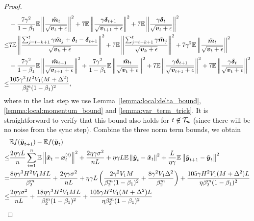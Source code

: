 \begin{proof}
\begin{align*}
    & + 
    \frac{7\gamma^2}{1-\beta_1}\mathbb{E}\left\| \frac{\tilde{\boldsymbol{m}}_{t}}{\sqrt{\boldsymbol{v}_{t}+\epsilon}} \right\|^2 + 
    7\mathbb{E}\left\| \frac{\gamma\boldsymbol{\delta}_{t+1}}{\sqrt{\boldsymbol{v}_{t+1}+\epsilon}} \right\|^2 + 
    7\mathbb{E}\left\| \frac{\gamma\boldsymbol{\delta}_{t}}{\sqrt{\boldsymbol{v}_{t}+\epsilon}} \right\|^2 \\
\leq & 7\mathbb{E}\left\| \frac{\sum_{j=t-k+1}^{t}\gamma\tilde{\boldsymbol{m}}_j + \boldsymbol{\delta}_t - \boldsymbol{\delta}_{t+1}}{\sqrt{\boldsymbol{v}_k+\epsilon}} \right\|^2 + 7\mathbb{E}\left\| \frac{\sum_{j=t-k+1}^{t}\gamma\tilde{\boldsymbol{m}}_j}{\sqrt{\boldsymbol{v}_k+\epsilon}} \right\|^2 + 
    7\gamma^2\mathbb{E}\left\| \frac{\tilde{\boldsymbol{m}}_t}{\sqrt{\boldsymbol{v}_t+\epsilon}} \right\|^2 \\
    & + 
    \frac{7\gamma^2}{1-\beta_1}\mathbb{E}\left\| \frac{\tilde{\boldsymbol{m}}_{t+1}}{\sqrt{\boldsymbol{v}_{t+1}+\epsilon}} \right\|^2 + 
    \frac{7\gamma^2}{1-\beta_1}\mathbb{E}\left\| \frac{\tilde{\boldsymbol{m}}_{t}}{\sqrt{\boldsymbol{v}_{t}+\epsilon}} \right\|^2 + 
    7\mathbb{E}\left\| \frac{\gamma\boldsymbol{\delta}_{t+1}}{\sqrt{\boldsymbol{v}_{t+1}+\epsilon}} \right\|^2 + 
    7\mathbb{E}\left\| \frac{\gamma\boldsymbol{\delta}_{t}}{\sqrt{\boldsymbol{v}_{t}+\epsilon}} \right\|^2 \\
\leq & \frac{105\gamma^2H^2V_1(M+\Delta^2)}{\beta_2^m(1-\beta_1)^2},
\end{align*}
where in the last step we use Lemma~\ref{lemma:local:delta_bound}, \ref{lemma:local:momentum_bound} and \ref{lemma:var_term_trick}. 
It is straightforward to verify that this bound also holds for $t\not\in\mathcal{T}_{\boldsymbol{u}}$ (since there will be no noise from the sync step).
Combine the three norm term bounds, we obtain
\begin{align*}
    & \mathbb E f(\tilde{\*y}_{t+1}) - \mathbb Ef(\tilde{\*y}_{t}) \\
\leq & \frac{2\eta\gamma L}{n}\sum_{i=1}^{n}\mathbb E\left\|\tilde{\*x}_t - \*x_t^{(i)}\right\|^2 + \frac{2\eta\gamma\sigma^2}{nL} + \eta\gamma L\mathbb E\left\| \tilde{\*y}_t - \tilde{\*x}_t\right\|^2 + \frac{L}{\eta\gamma}\mathbb E\left\|\tilde{\*y}_{t+1} - \tilde{\*y}_t \right\|^2 \\
    = & \frac{8\eta\gamma^3H^2V_1ML}{\beta_2^m} + \frac{2\eta\gamma\sigma^2}{nL} + \eta\gamma L\left( \frac{2\gamma^2V_1M}{\beta_2^m(1-\beta_1)^2} + \frac{8\gamma^2V_1\Delta^2}{\beta_2^m} \right) + \frac{105\gamma H^2V_1(M+\Delta^2)L}{\eta\beta_2^m(1-\beta_1)^2} \\
\leq & \frac{2\eta\gamma\sigma^2}{nL} + 
\frac{18\eta\gamma^3H^2V_1ML}{\beta_2^m(1-\beta_1)^2} + \frac{105\gamma H^2V_1(M+\Delta^2)L}{\eta\beta_2^m(1-\beta_1)^2} \\

\end{align*}
\end{proof}
